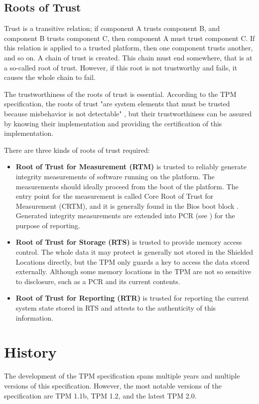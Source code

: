 \subsection{Roots of Trust}
Trust is a transitive relation; if component A trusts component B, and component B trusts component C, then component A must trust component C. If this relation is applied to a trusted platform, then one component trusts another, and so on. A chain of trust is created. This chain must end somewhere, that is at a so-called root of trust. However, if this root is not trustworthy and fails, it causes the whole chain to fail.

The trustworthiness of the roots of trust is essential. According to the TPM specification, the roots of trust "are system elements that must be trusted because misbehavior is not detectable" \cite[p.~23]{tcg_p1_architecture}, but their trustworthiness can be assured by knowing their implementation and providing the certification of this implementation.

There are three kinds of roots of trust required:
\begin{itemize}
    \item \textbf{Root of Trust for Measurement (RTM)} is trusted to reliably generate integrity measurements of software running on the platform. The measurements should ideally proceed from the boot of the platform. The entry point for the measurement is called Core Root of Trust for Measurement (CRTM), and it is generally found in the Bios boot block \cite[p.~185]{Tomlinson2017}. Generated integrity measurements are extended into PCR (see ) for the purpose of reporting.
    \item \textbf{Root of Trust for Storage (RTS)} is trusted to provide memory access control. The whole data it may protect is generally not stored in the Shielded Locations directly, but the TPM only guards a key to access the data stored externally. Although some memory locations in the TPM are not so sensitive to disclosure, such as a PCR and its current contents. 
    \item \textbf{Root of Trust for Reporting (RTR)} is trusted for reporting the current system state stored in RTS and attests to the authenticity of this information.
\end{itemize}


\section{History}
The development of the TPM specification spans multiple years and multiple versions of this specification. However, the most notable versions of the specification are TPM 1.1b, TPM 1.2, and the latest TPM 2.0. 

